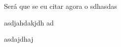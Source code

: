 \label{introducao}

Será que se eu citar agora o \cite{Bacchin2006}
sdhasdas 

asdjahdakjdh ad

asdajdhaj
 
\newpage 